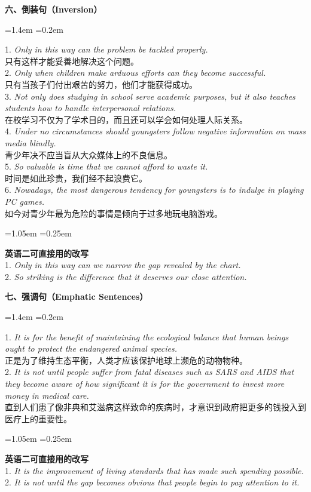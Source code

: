 \documentclass[11pt,a4paper]{ctexart}
\newcommand{\en}[1]{\textit{#1}}
\newenvironment{note}{%
  \par\addvspace{5pt}%
  \begin{list}{}{\leftmargin=1.05em \rightmargin=0.25em \listparindent=0pt
    \itemindent=0pt \topsep=0pt \parsep=2pt \itemsep=2pt \partopsep=0pt}%
  \item\relax\small\color{ink}%
}{%
  \end{list}\addvspace{5pt}%
}
\newenvironment{eg}{%
  \par\addvspace{4pt}%
  \begin{list}{}{\leftmargin=1.4em \rightmargin=0.2em \listparindent=0pt
    \itemindent=0pt \topsep=0pt \parsep=2pt \itemsep=2pt \partopsep=0pt}%
  \item\relax
}{%
  \end{list}\addvspace{5pt}%
}
\begin{document}
\par\addvspace{6pt}\noindent\textbf{六、倒装句（Inversion）}\par\addvspace{2pt}
\begin{eg}
1. \en{Only in this way can the problem be tackled properly.}\\
只有这样才能妥善地解决这个问题。\\
2. \en{Only when children make arduous efforts can they become successful.}\\
只有当孩子们付出艰苦的努力，他们才能获得成功。\\
3. \en{Not only does studying in school serve academic purposes, but it also teaches students how to handle interpersonal relations.}\\
在校学习不仅为了学术目的，而且还可以学会如何处理人际关系。\\
4. \en{Under no circumstances should youngsters follow negative information on mass media blindly.}\\
青少年决不应当盲从大众媒体上的不良信息。\\
5. \en{So valuable is time that we cannot afford to waste it.}\\
时间是如此珍贵，我们经不起浪费它。\\
6. \en{Nowadays, the most dangerous tendency for youngsters is to indulge in playing PC games.}\\
如今对青少年最为危险的事情是倾向于过多地玩电脑游戏。\\
\end{eg}
\begin{note}
\textbf{英语二可直接用的改写}\\
1. \en{Only in this way can we narrow the gap revealed by the chart.}\\
2. \en{So striking is the difference that it deserves our close attention.}
\end{note}

\par\addvspace{6pt}\noindent\textbf{七、强调句（Emphatic Sentences）}\par\addvspace{2pt}
\begin{eg}
1. \en{It is for the benefit of maintaining the ecological balance that human beings ought to protect the endangered animal species.}\\
正是为了维持生态平衡，人类才应该保护地球上濒危的动物物种。\\
2. \en{It is not until people suffer from fatal diseases such as SARS and AIDS that they become aware of how significant it is for the government to invest more money in medical care.}\\
直到人们患了像非典和艾滋病这样致命的疾病时，才意识到政府把更多的钱投入到医疗上的重要性。\\
\end{eg}
\begin{note}
\textbf{英语二可直接用的改写}\\
1. \en{It is the improvement of living standards that has made such spending possible.}\\
2. \en{It is not until the gap becomes obvious that people begin to pay attention to it.}
\end{note}
\end{document}
